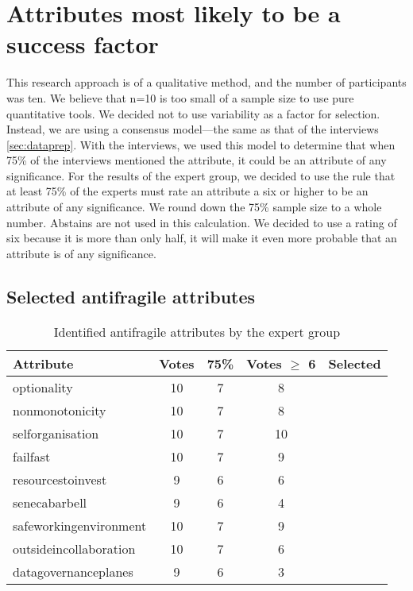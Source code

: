 \section{Attributes most likely to be a success factor}
\label{sec:expertattributessf}
This research approach is of a qualitative method, and the number of participants was ten. We believe that n=10 is too small of a sample size to use pure quantitative tools. We decided not to use variability as a factor for selection. Instead, we are using a consensus model—the same as that of the interviews \cref{sec:dataprep}. With the interviews, we used this model to determine that when 75\% of the interviews mentioned the \gls{attribute}, it could be an \gls{attribute} of any significance. For the results of the expert group, we decided to use the rule that at least 75\% of the experts must rate an \gls{attribute} a six or higher to be an attribute of any significance. We round down the 75\% sample size to a whole number. Abstains are not used in this calculation. We decided to use a rating of six because it is more than only half, it will make it even more probable that an attribute is of any significance.

\subsection{Selected antifragile attributes}
\label{sub:validationselectedafattributes}


\begin{longtable}{@{}lcccc@{}}
	\toprule%
	\textbf{Attribute} & \textbf{Votes} & \textbf{75\%} & \textbf{Votes $\geq$ 6} & \textbf{Selected} \\%
	\midrule%
	\endhead%
	\hline
	\endfoot%
	\caption[Identified antifragile attributes by the expert group]{Identified antifragile attributes by the expert group}
	\label{tab:expertgrouppossiblesf}
	\endlastfoot%
	\Gls{optionality} & 10 & 7 & 8 & \checkmark \\%
	\Gls{nonmonotonicity} & 10 & 7 & 8 & \checkmark \\%
	\Gls{selforganisation} & 10 & 7 & 10 & \checkmark \\%
	\Gls{failfast} & 10 & 7 & 9 & \checkmark \\%
	\Gls{resourcestoinvest} & 9 & 6 & 6 &  \checkmark\\%
	\Gls{senecabarbell} & 9 & 6 & 4 & \\%
	\Gls{safeworkingenvironment} & 10 & 7 & 9 & \checkmark \\%
	\Gls{outsideincollaboration} & 10 & 7 & 6 & \\%
	\Gls{datagovernanceplanes} & 9 & 6 & 3 & \\%
	\bottomrule%
\end{longtable}%

